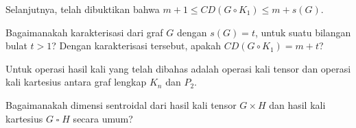 Selanjutnya, telah dibuktikan bahwa $m+1\le CD(G\circ K_1)\le m+s(G)$.
\begin{masalah}
	Bagaimanakah karakterisasi dari graf $G$ dengan $s(G)=t$, untuk suatu bilangan bulat $t>1$? Dengan karakterisasi tersebut, apakah $CD(G\circ K_1)=m+t$?
\end{masalah}

Untuk operasi hasil kali yang telah dibahas adalah operasi kali tensor dan operasi kali kartesius antara graf lengkap $K_n$ dan $P_2$.
\begin{masalah}
	Bagaimanakah dimensi sentroidal dari hasil kali tensor $G\times H$ dan hasil kali kartesius $G\;\square\; H$ secara umum?
\end{masalah}